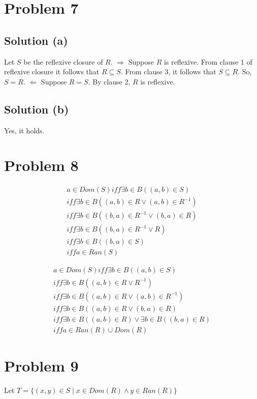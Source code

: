 \documentclass{article}
\begin{document}
\section{Problem 7}
\subsection{Solution (a)}
Let $S$ be the reflexive closure of $R$.
$\Rightarrow$ Suppose $R$ is reflexive. From clause $1$ of reflexive
closure it follows that $R \subseteq S$. From clause 3, it follows
that $S \subseteq R$. So, $S = R$.
$\Leftarrow$ Suppose $R = S$. By clause 2, $R$ is reflexive.

\subsection{Solution (b)}
Yes, it holds.

\section{Problem 8}
\begin{align*}
  a \in Dom(S) iff \exists b \in B((a,b) \in S) \\
  iff \exists b \in B((a,b) \in R \lor (a,b) \in R^{-1}) \\
  iff \exists b \in B((b,a) \in R^{-1} \lor (b,a) \in R) \\
  iff \exists b \in B((b,a) \in R^{-1} \lor R) \\
  iff \exists b \in B((b,a) \in S) \\
  iff a \in Ran(S)
\end{align*}

\begin{align*}
  a \in Dom(S) iff \exists b \in B((a,b) \in S) \\
  iff \exists b \in B((a,b) \in R \lor R^{-1}) \\
  iff \exists b \in B((a,b) \in R \lor (a,b) \in R^{-1}) \\
  iff \exists b \in B((a,b) \in R \lor (b,a) \in R) \\
  iff \exists b \in B((a,b) \in R) \lor \exists b \in B((b,a) \in R) \\
  iff a \in Ran(R) \cup Dom(R)
\end{align*}

\section{Problem 9}
Let $T = \{(x,y) \in S \mid x \in Dom(R) \land y \in Ran(R)\}$ \\
\end{document}
